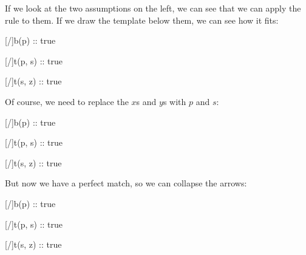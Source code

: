 \documentclass[../../../main.tex]{subfiles}
\begin{document}
\noindent
If we look at the two assumptions on the left, we can see that we can apply the  rule to them. If we draw the  template below them, we can see how it fits:

\begin{prooftree*}
  \hypo{}
  [\startrule/]{b(p) :: true}

  \hypo{}
  [\startrule/]{t(p, s) :: true}

  
  \hypo{}
  [\startrule/]{t(s, z) :: true}
  \ellipsis{}{}
      
  
\end{prooftree*}

\noindent
Of course, we need to replace the $x$s and $y$s with $p$ and $s$:


\begin{prooftree*}
  \hypo{}
  [\startrule/]{b(p) :: true}

  \hypo{}
  [\startrule/]{t(p, s) :: true}

  
  \hypo{}
  [\startrule/]{t(s, z) :: true}
  \ellipsis{}{}
      
  
\end{prooftree*}

\noindent
But now we have a perfect match, so we can collapse the arrows:

\begin{prooftree*}
  \hypo{}
  [\startrule/]{b(p) :: true}

  \hypo{}
  [\startrule/]{t(p, s) :: true}

  
  \hypo{}
  [\startrule/]{t(s, z) :: true}
  \ellipsis{}{}
      
  
\end{prooftree*}
\end{document}
